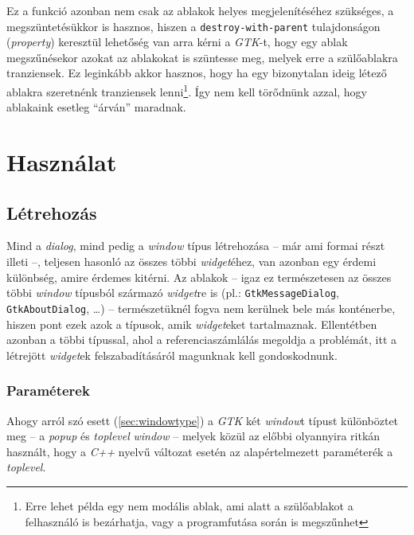 Ez a funkció azonban nem csak az ablakok helyes megjelenítéséhez szükséges, a megszüntetésükkor is hasznos, hiszen a \texttt{destroy-with-parent} tulajdonságon (\textit{property}) keresztül lehetőség van arra kérni a \textit{GTK}-t, hogy egy ablak megszűnésekor azokat az ablakokat is szüntesse meg, melyek erre a szülőablakra tranziensek. Ez leginkább akkor hasznos, hogy ha egy bizonytalan ideig létező ablakra szeretnénk tranziensek lenni\footnote{Erre lehet példa egy nem modális ablak, ami alatt a szülőablakot a felhasználó is bezárhatja, vagy a programfutása során is megszűnhet}. Így nem kell törődnünk azzal, hogy ablakaink esetleg ``árván'' maradnak.\label{par:windowdestroywithparent}

\section{Használat}

\subsection{Létrehozás}

Mind a \textit{dialog}, mind pedig a \textit{window} típus létrehozása -- már ami formai részt illeti --, teljesen hasonló az összes többi \textit{widget}éhez, van azonban egy érdemi különbség, amire érdemes kitérni. Az ablakok -- igaz ez természetesen az összes többi \textit{window} típusból származó \textit{widget}re is (pl.: \texttt{GtkMessageDialog}, \texttt{GtkAboutDialog}, \dots) -- természetüknél fogva nem kerülnek bele más konténerbe, hiszen pont ezek azok a típusok, amik \textit{widget}eket tartalmaznak. Ellentétben azonban a többi típussal, ahol a referenciaszámlálás megoldja a problémát, itt a létrejött \textit{widget}ek felszabadításáról magunknak kell gondoskodnunk.

\subsubsection{Paraméterek}

Ahogy arról szó esett (\ref{sec:windowtype}) a \textit{GTK} két \textit{window}t típust különböztet meg -- a \textit{popup} és \textit{toplevel} \textit{window} -- melyek közül az előbbi olyannyira ritkán használt, hogy a \textit{C++} nyelvű változat esetén az alapértelmezett paraméterék a \textit{toplevel}.

